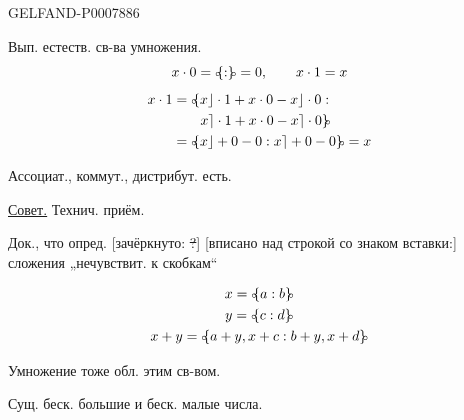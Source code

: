 \begin{GelfandAdjacentEvidence}{GELFAND-P000788}{6}


Вып. естеств. св-ва умножения.
\[
x\cdot0=\mathopen{{\scriptstyle\circ}\mkern-5mu\{}:\mathclose{\}\mkern-5mu{\scriptstyle\circ}}=0,\qquad x\cdot1=x
\]
\[
\begin{aligned}
x\cdot1&=\mathopen{{\scriptstyle\circ}\mkern-5mu\{}x\rfloor\cdot1+x\cdot0-x\rfloor\cdot0:\\
&\qquad x\rceil\cdot1+x\cdot0-x\rceil\cdot0\mathclose{\}\mkern-5mu{\scriptstyle\circ}}\\
&=\mathopen{{\scriptstyle\circ}\mkern-5mu\{}x\rfloor+0-0:x\rceil+0-0\mathclose{\}\mkern-5mu{\scriptstyle\circ}}=x
\end{aligned}
\]

Ассоциат., коммут., дистрибут. есть.


\underline{\underline{Совет.}} Технич. приём.

Док., что опред. [зачёркнуто: \sout{?}] [вписано над строкой со знаком вставки:] сложения „нечувствит. к скобкам“

\hfill{}

\end{GelfandAdjacentEvidence}


\begin{gather*}
x=\mathopen{{\scriptstyle\circ}\mkern-5mu\{}a:b\mathclose{\}\mkern-5mu{\scriptstyle\circ}}\\
y=\mathopen{{\scriptstyle\circ}\mkern-5mu\{}c:d\mathclose{\}\mkern-5mu{\scriptstyle\circ}}\\
x+y=\mathopen{{\scriptstyle\circ}\mkern-5mu\{}a+y,x+c:b+y,x+d\mathclose{\}\mkern-5mu{\scriptstyle\circ}}
\end{gather*}

Умножение тоже обл. этим св-вом.


Сущ. беск. большие и беск. малые числа.


